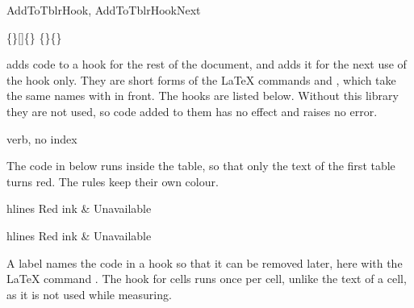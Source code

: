 \begin{codedescribe}[
        code,
        new=2025A
    ]{AddToTblrHook, AddToTblrHookNext}
    \begin{codesyntax}
        \{\}[]\{\}
        \{\}\{\}
    \end{codesyntax}
     adds code to a hook for the rest of the document, and  adds it for the next use of the hook only. They are short forms of the \LaTeX{} commands  and , which take the same names with  in front. The hooks are listed below. Without this library they are not used, so code added to them has no effect and raises no error.
    \begin{describelist*}{verb, no index}
    \end{describelist*}

    The code in  below runs inside the table, so that only the text of the first table turns red. The rules keep their own colour.

    \begin{codestore}[st=lib:hook:next]
        \begin{tblr}{hlines}
            Red ink & Unavailable
        \end{tblr}\quad
        \begin{tblr}{hlines}
            Red ink & Unavailable
        \end{tblr}\end{codestore}
    \begin{center}
    \end{center}

    A label names the code in a hook so that it can be removed later, here with the \LaTeX{} command . The hook for cells runs once per cell, unlike the text of a cell, as it is not used while measuring.


\end{codedescribe}
